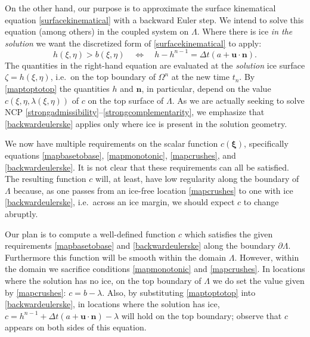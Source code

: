 \documentclass[letterpaper,final,12pt,reqno]{amsart}
\newcommand{\bn}{\mathbf{n}}
\newcommand{\bu}{\mathbf{u}}
\newcommand{\bxi}{\bm{\xi}}
\begin{document}
On the other hand, our purpose is to approximate the surface kinematical equation \eqref{surfacekinematical} with a backward Euler step.  We intend to solve this equation (among others) in the coupled system on $\Lambda$.  Where there is ice \emph{in the solution} we want the discretized form of \eqref{surfacekinematical} to apply:
\begin{equation}
h(\xi,\eta)>b(\xi,\eta) \quad \iff \quad h - h^{n-1} = \Delta t\left(a + \bu \cdot \bn\right). \label{backwardeulerske}
\end{equation}
The quantities in the right-hand equation are evaluated at the \emph{solution} ice surface $\zeta=h(\xi,\eta)$, i.e.~on the top boundary of $\Omega^n$ at the new time $t_n$.  By \eqref{maptoptotop} the quantities $h$ and $\bn$, in particular, depend on the value $c(\xi,\eta,\lambda(\xi,\eta))$ of $c$ on the top surface of $\Lambda$.  As we are actually seeking to solve NCP \eqref{strongadmissibility}--\eqref{strongcomplementarity}, we emphasize that \eqref{backwardeulerske} applies only where ice is present in the solution geometry.

We now have multiple requirements on the scalar function $c(\bxi)$, specifically equations \eqref{mapbasetobase}, \eqref{mapmonotonic}, \eqref{mapcrushes}, and \eqref{backwardeulerske}.  It is not clear that these requirements can all be satisfied.  The resulting function $c$ will, at least, have low regularity along the boundary of $\Lambda$ because, as one passes from an ice-free location \eqref{mapcrushes} to one with ice \eqref{backwardeulerske}, i.e.~across an ice margin, we should expect $c$ to change abruptly.

Our plan is to compute a well-defined function $c$ which satisfies the given requirements \eqref{mapbasetobase} and \eqref{backwardeulerske} along the boundary $\partial \Lambda$.  Furthermore this function will be smooth within the domain $\Lambda$.  However, within the domain we sacrifice conditions \eqref{mapmonotonic} and \eqref{mapcrushes}.  In locations where the solution has no ice, on the top boundary of $\Lambda$ we do set the value given by \eqref{mapcrushes}: $c=b-\lambda$.  Also, by substituting \eqref{maptoptotop} into \eqref{backwardeulerske}, in locations where the solution has ice, $c=h^{n-1} + \Delta t\left(a + \bu \cdot \bn\right) - \lambda$ will hold on the top boundary; observe that $c$ appears on both sides of this equation.
\end{document}
